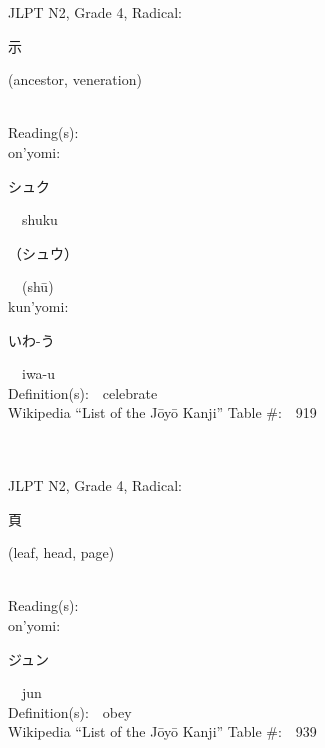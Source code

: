 \begin{multicols}{2}
{JLPT N2, Grade 4, Radical:\ \ {\begin{CJK}{UTF8}{min} 示 \end{CJK}} (ancestor, veneration) } \\
Reading(s):\ \ \\
{\hspace*{1em}}on'yomi:\ \ \\
{\hspace*{2em}}{\begin{CJK}{UTF8}{min} シュク \end{CJK}}\ \ shuku\ \ \\
{\hspace*{2em}}{\begin{CJK}{UTF8}{min} （シュウ） \end{CJK}}\ \ (sh\=u)\ \ \\
{\hspace*{1em}}kun'yomi:\ \ \\
{\hspace*{2em}}{\begin{CJK}{UTF8}{min} いわ-う \end{CJK}}\ \ iwa-u\ \ \\
Definition(s):\ \ celebrate \\
Wikipedia ``List of the J\=oy\=o Kanji'' Table \#:\ \ 919 \\
\ \ \\
{\fontsize{34pt}{40pt}  }\ \ \\  %
{JLPT N2, Grade 4, Radical:\ \ {\begin{CJK}{UTF8}{min} 頁 \end{CJK}} (leaf, head, page) } \\
Reading(s):\ \ \\
{\hspace*{1em}}on'yomi:\ \ \\
{\hspace*{2em}}{\begin{CJK}{UTF8}{min} ジュン \end{CJK}}\ \ jun\ \ \\
Definition(s):\ \ obey \\
Wikipedia ``List of the J\=oy\=o Kanji'' Table \#:\ \ 939 \\
\ \ \\
{\fontsize{34pt}{40pt}  }\ \ \\  %

\end{multicols}
